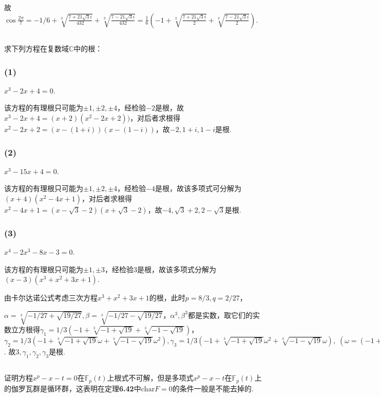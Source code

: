 故$\cos \frac{2\pi}{7}=-1/6+\sqrt[3]{\frac{7+21\sqrt{3}i}{432}}+\sqrt[3]{\frac{7-21\sqrt{3}i}{432}}=\frac{1}{6}(-1+\sqrt[3]{\frac{7+21\sqrt{3}i}{2}}+\sqrt[3]{\frac{7-21\sqrt{3}i}{2}})$.

\subsection{}
求下列方程在复数域$\mathbb{C}$中的根：
\subsubsection{(1)}
$x^3-2x+4=0$.

\jie 该方程的有理根只可能为$\pm1,\pm2,\pm4$，经检验$-2$是根，故$x^3-2x+4=(x+2)(x^2-2x+2))$，对后者求根得$x^2-2x+2=(x-(1+i))(x-(1-i))$，故$-2,1+i,1-i$是根.

\subsubsection{(2)}
$x^3-15x+4=0$.

\jie
该方程的有理根只可能为$\pm1,\pm2,\pm4$，经检验$-4$是根，故该多项式可分解为$(x+4)(x^2-4x+1)$，对后者求根得$x^2-4x+1=(x-\sqrt{3}-2)(x+\sqrt{3}-2)$，故$-4,\sqrt{3}+2,2-\sqrt{3}$是根.

\subsubsection{(3)}
$x^4-2x^3-8x-3=0$.

\jie
该方程的有理根只可能为$\pm1,\pm3$，经检验$3$是根，故该多项式分解为$(x-3)(x^3+x^2+3x+1)$.

由卡尔达诺公式考虑三次方程$x^3+x^2+3x+1$的根，此时$p=8/3,q=2/27$，

$\alpha=\sqrt[3]{-1/27+\sqrt{19/27}}, \beta=\sqrt[3]{-1/27-\sqrt{19/27}}$，$\alpha^3,\beta^3$都是实数，取它们的实数立方根得$\gamma_1=1/3(-1+\sqrt[3]{-1+\sqrt{19}}+\sqrt[3]{-1-\sqrt{19}})$，
$\gamma_2=1/3(-1+\sqrt[3]{-1+\sqrt{19}}\omega+\sqrt[3]{-1-\sqrt{19}}\omega^2),\gamma_3=1/3(-1+\sqrt[3]{-1+\sqrt{19}}\omega^2+\sqrt[3]{-1-\sqrt{19}}\omega),
\;(\omega=(-1+\sqrt{3}i)/2=\zeta_3)$. 故$3, \gamma_1,\gamma_2,\gamma_3$是根.

\subsection{}
证明方程$x^p-x-t=0$在$\mathbb{F}_p(t)$上根式不可解，但是多项式$x^p-x-t$在$\mathbb{F}_p(t)$上的伽罗瓦群是循环群，这表明在{\heiti 定理}\textbf{6.42}中$\mathrm{char}F=0$的条件一般是不能去掉的.

